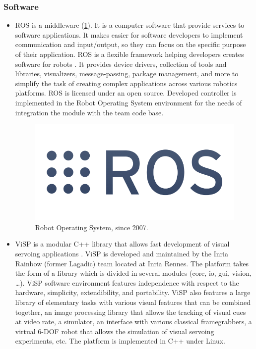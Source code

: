 \subsubsection{Software}
\begin{itemize}
    \item 
\gls{ROS} is a middleware (\ref{pict:ros}). It is a computer software that provide services to software applications. It makes easier for software developers to implement communication and input/output, so they can focus on the specific purpose of their application.
\gls{ROS} is a flexible framework helping developers creates software for robots \cite{288}. It provides device drivers, collection of tools and libraries, visualizers, message-passing, package management, and more to simplify the task of creating complex applications across various robotics platforms. ROS is licensed under an open source. Developed controller is implemented in the Robot Operating System environment for the needs of integration the module with the team code base.
\begin{figure} [!ht]
    \centering
    \includegraphics[width=0.35\linewidth]{images/ros.png}
    \caption{Robot Operating System, since 2007.}
    \label{pict:ros}
\end{figure}

    \item
\gls{ViSP} is a modular C++ library that allows fast development of visual servoing applications \cite{articlevisp}. ViSP is developed and maintained by the Inria Rainbow (former Lagadic) team located at Inria Rennes. The platform takes the form of a library which is divided in several modules (core, io, gui, vision, …). ViSP software environment features independence with respect to the hardware, simplicity, extendibility, and portability. ViSP also features a large library of elementary tasks with various visual features that can be combined together, an image processing library that allows the tracking of visual cues at video rate, a simulator, an interface with various classical framegrabbers, a virtual 6-DOF robot that allows the simulation of visual servoing experiments, etc. The platform is implemented in C++ under Linux.


\end{itemize}
